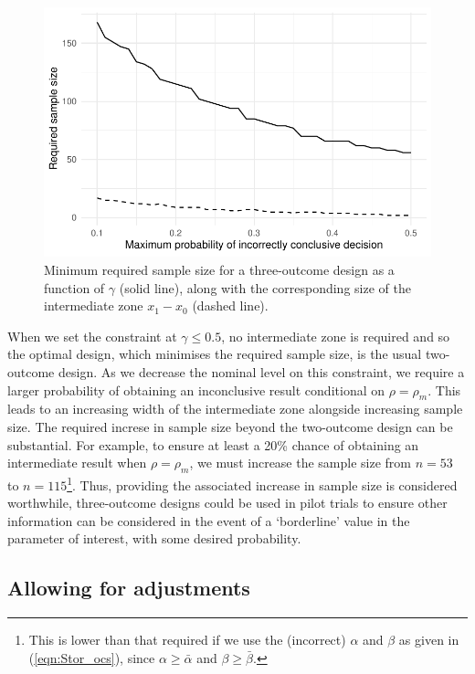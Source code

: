 \documentclass[Crown, times, sagev]{sagej}
\begin{document}
\begin{figure}
\centering
\includegraphics[scale=0.8]{./figures/gamma_ns}
\caption{Minimum required sample size for a three-outcome design as a function of $\gamma$ (solid line), along with the corresponding size of the intermediate zone $x_1 - x_0$ (dashed line).}
\label{fig:gamma_ns}
\end{figure}

When we set the constraint at $\gamma \leq 0.5$, no intermediate zone is required and so the optimal design, which minimises the required sample size, is the usual two-outcome design. As we decrease the nominal level on this constraint, we require a larger probability of obtaining an inconclusive result conditional on $\rho = \rho_m$. This leads to an increasing width of the intermediate zone alongside increasing sample size. The required increse in sample size beyond the two-outcome design can be substantial. For example, to ensure at least a 20\% chance of obtaining an intermediate result when $\rho = \rho_m$, we must increase the sample size from $n = 53$ to $n = 115$\footnote{This is lower than that required if we use the (incorrect) $\alpha$ and $\beta$ as given in (\ref{eqn:Stor_ocs}), since $\alpha \geq \bar{\alpha}$ and $\beta \geq \bar{\beta}$.}. Thus, providing the associated increase in sample size is considered worthwhile, three-outcome designs could be used in pilot trials to ensure other information can be considered in the event of a `borderline' value in the parameter of interest, with some desired probability.

\subsection{Allowing for adjustments}
\end{document}
